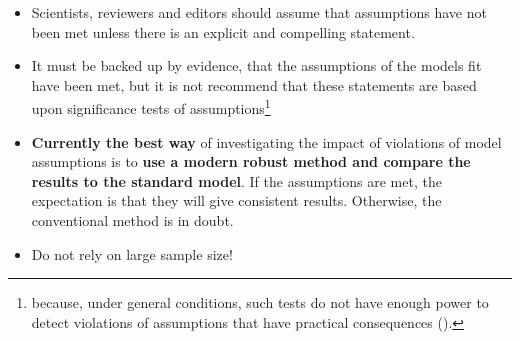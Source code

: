 \documentclass[
]{article}
\providecommand{\tightlist}{%
  \setlength{\itemsep}{0pt}\setlength{\parskip}{0pt}}
\begin{document}
\begin{itemize}
\tightlist
\item
  Scientists, reviewers and editors should assume that assumptions have not been met unless there is an explicit and compelling statement.
\item
  It must be backed up by evidence, that the assumptions of the models fit have been met, but it is not recommend that these statements are based upon significance tests of assumptions\footnote{ because, under general conditions, such tests do not have enough power to detect violations of assumptions that have practical consequences ().}
\item
  \textbf{Currently the best way} of investigating the impact of violations of model assumptions is to \textbf{use a modern robust method and compare the results to the standard model}. If the assumptions are met, the expectation is that they will give consistent results. Otherwise, the conventional method is in doubt.
\item
  Do not rely on large sample size!


\end{itemize}
\end{document}
